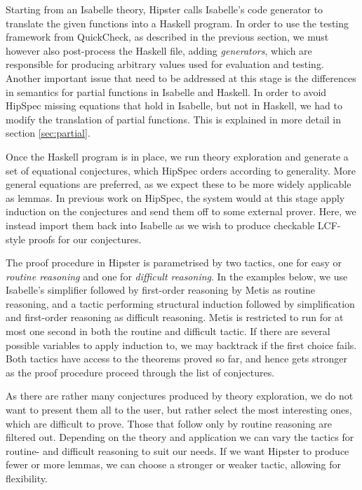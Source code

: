 Starting from an Isabelle theory, Hipster calls Isabelle's code generator \cite{codegen} to translate the given functions into a Haskell program. In order to use the testing framework from QuickCheck, as described in the previous section, we must however also post-process the Haskell file, adding \emph{generators}, which are responsible for producing arbitrary values used for evaluation and testing. 
Another important issue that need to be addressed at this stage is the differences in semantics for partial functions in Isabelle and Haskell. In order to avoid HipSpec missing equations that hold in Isabelle, but not in Haskell, we had to modify the translation of partial functions. This is explained in more detail in section \ref{sec:partial}.

Once the Haskell program is in place, we run theory exploration and generate a set of equational conjectures, which HipSpec orders according to generality. More general equations are preferred, as we expect these to be more widely applicable as lemmas. In previous work on HipSpec, the system would at this stage apply induction on the conjectures and send them off to some external prover. Here, we instead import them back into Isabelle as we wish to produce checkable LCF-style proofs for our conjectures. 

The proof procedure in Hipster is parametrised by two tactics, one for easy or \emph{routine reasoning} and one for \emph{difficult reasoning}. In the examples below, we use Isabelle's simplifier followed by first-order reasoning by Metis \cite{metis} as routine reasoning, and a tactic performing structural induction followed by simplification and first-order reasoning as difficult reasoning. Metis is restricted to run for at most one second in both the routine and difficult tactic. If there are several possible variables to apply induction to, we may backtrack if the first choice fails. Both tactics have access to the theorems proved so far, and hence gets stronger as the proof procedure proceed through the list of conjectures. 

As there are rather many conjectures produced by theory exploration, we do not want to present them all to the user, but rather select the most interesting ones, which are difficult to prove. Those that follow only by routine reasoning are filtered out. 
Depending on the theory and application we can vary the tactics for routine- and difficult reasoning to suit our needs. If we want Hipster to produce fewer or more lemmas, we can choose a stronger or weaker tactic, allowing for flexibility.  

